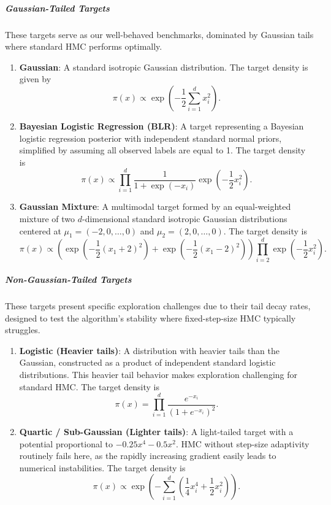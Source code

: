 \documentclass{article}
\begin{document}
\subparagraph{Gaussian-Tailed Targets}
These targets serve as our well-behaved benchmarks, dominated by Gaussian tails where standard HMC performs optimally.
\begin{enumerate}
    \item \textbf{Gaussian}: A standard isotropic Gaussian distribution. The target density is given by
    \begin{equation*}
        \pi(x) \propto \exp\left(-\frac{1}{2} \sum_{i=1}^d x_i^2\right).
    \end{equation*}
    
    \item \textbf{Bayesian Logistic Regression (BLR)}: A target representing a Bayesian logistic regression posterior with independent standard normal priors, simplified by assuming all observed labels are equal to 1. The target density is
    \begin{equation*}
        \pi(x) \propto \prod_{i=1}^d \frac{1}{1 + \exp(-x_i)} \exp\left(-\frac{1}{2} x_i^2\right).
    \end{equation*}

    \item \textbf{Gaussian Mixture}: A multimodal target formed by an equal-weighted mixture of two $d$-dimensional standard isotropic Gaussian distributions centered at $\mu_1 = (-2, 0, \dots, 0)$ and $\mu_2 = (2, 0, \dots, 0)$. The target density is
    \begin{equation*}
        \pi(x) \propto \left( \exp\left(-\frac{1}{2} (x_1+2)^2\right) + \exp\left(-\frac{1}{2} (x_1-2)^2\right) \right) \prod_{i=2}^d \exp\left(-\frac{1}{2} x_i^2\right).
    \end{equation*}
\end{enumerate}

\subparagraph{Non-Gaussian-Tailed Targets}
These targets present specific exploration challenges due to their tail decay rates, designed to test the algorithm's stability where fixed-step-size HMC typically struggles.
\begin{enumerate}
    \item \textbf{Logistic (Heavier tails)}: A distribution with heavier tails than the Gaussian, constructed as a product of independent standard logistic distributions. This heavier tail behavior makes exploration challenging for standard HMC. The target density is
    \begin{equation*}
        \pi(x) = \prod_{i=1}^d \frac{e^{-x_i}}{(1 + e^{-x_i})^2}.
    \end{equation*}
    
    \item \textbf{Quartic / Sub-Gaussian (Lighter tails)}: A light-tailed target with a potential proportional to $-0.25 x^4 - 0.5 x^2$. HMC without step-size adaptivity routinely fails here, as the rapidly increasing gradient easily leads to numerical instabilities. The target density is
    \begin{equation*}
        \pi(x) \propto \exp\left(-\sum_{i=1}^d \left(\frac{1}{4} x_i^4 + \frac{1}{2} x_i^2\right)\right).
    \end{equation*}
\end{enumerate}
\end{document}
